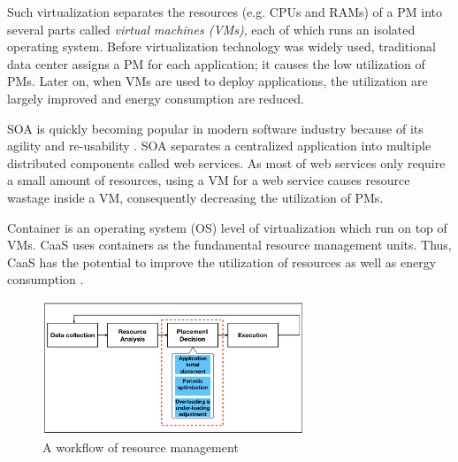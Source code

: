  Such virtualization separates the resources (e.g. CPUs and RAMs) of a PM into several parts called \emph{virtual machines (VMs)}, each of which runs an isolated operating system. Before virtualization technology was widely used, traditional data center assigns a PM for each application; it causes the low utilization of PMs. Later on, when VMs are used to deploy applications, the utilization are largely improved and energy consumption are reduced. 

 SOA is quickly becoming popular in modern software industry because of its agility and re-usability \cite{}. SOA separates a centralized application into multiple distributed components called web services. As most of web services only require a small amount of resources,  using a VM for a web service causes resource wastage inside a VM, consequently decreasing the utilization of PMs. 


 Container is an operating system (OS) level of virtualization which run on top of VMs. CaaS uses containers as the fundamental resource management units. Thus, CaaS has the potential to improve the utilization of resources as well as energy consumption \cite{Esposito:2016br}. 



\begin{figure}
	\centering
	\includegraphics[width=0.7\textwidth]{pics/workflow_management.png}
	\caption{A workflow of resource management \cite{Mishra:2012kx}}
	\label{fig:workflow}
\end{figure}


